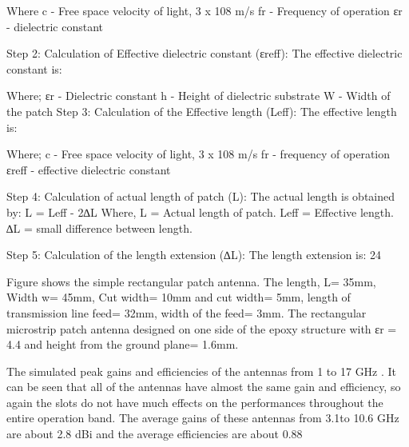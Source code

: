 \documentclass[12pt]{article}
\begin{document}
				                 Where
				                     c - Free space velocity of light, 3 x 108 m/s
				                 fr - Frequency of operation
				                 εr - dielectric constant
				                 
				                 Step 2: Calculation of Effective dielectric constant (εreff): 
				                 The effective dielectric constant is:
				                  		  
				                 Where;
				                        εr - Dielectric constant
				                 h - Height of dielectric substrate
				                 W - Width of the patch
				                 Step 3: Calculation of the Effective length (Leff):  
				                 The effective length is:
				                  					      
				                 Where;
				                  c - Free space velocity of light, 3 x 108 m/s
				                 fr - frequency of operation
				                 εreff - effective dielectric constant
				                 
				                 Step 4: Calculation of actual length of patch (L):  
				                 The actual length is obtained by:
				                 L = Leff - 2∆L					
				                 Where,
				                 L 	= Actual length of patch.
				                 Leff 	 = Effective length.
				                 ∆L 	= small difference between length.
				                 
				                 Step 5: Calculation of the length extension (∆L):  
				                 The length extension is:
				                 24
				                 
				                 Figure shows the simple rectangular patch antenna. 
				                 The length, L= 35mm, 
				                 Width w= 45mm,
				                 Cut width= 10mm 
				                 and cut width= 5mm, 
				                 length of transmission line feed= 32mm, 
				                 width of the feed= 3mm. 
				                 The rectangular microstrip patch antenna designed on one side of the epoxy structure with εr = 4.4 and height from the ground plane= 1.6mm. 
				                 
				                
				                 The simulated peak gains and efficiencies of the antennas from 1 to 17 GHz . It can be seen that all of the antennas have almost the same gain and efficiency, so again the slots do not have much effects on the performances throughout the entire operation band. The average gains of these antennas from 3.1to 10.6 GHz are about 2.8 dBi and the average efficiencies are about 0.88
				                 
\end{document}
